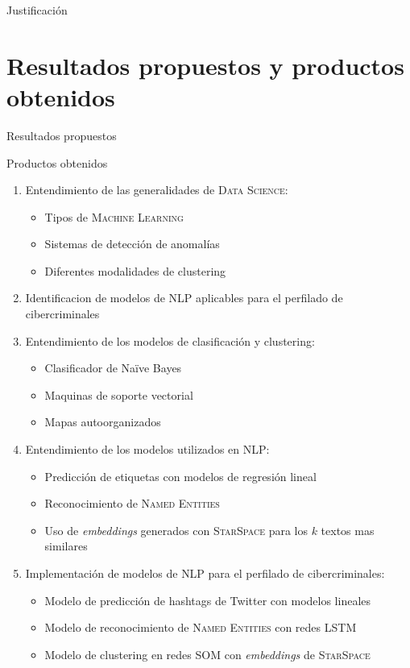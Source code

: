 \documentclass[10pt]{beamer}
\begin{document}
\begin{frame}{Justificación}
\end{frame}

\section{Resultados propuestos y productos obtenidos}

\begin{frame}{Resultados propuestos}
\end{frame}

\begin{frame}[allowframebreaks]{Productos obtenidos}
  \begin{enumerate}
  \item Entendimiento de las generalidades de \textsc{Data Science}:
    \begin{itemize}
    \item Tipos de \textsc{Machine Learning}
    \item Sistemas de detección de anomalías
    \item Diferentes modalidades de clustering
    \end{itemize}
  \item Identificacion de modelos de \textsc{NLP} aplicables para el perfilado de cibercriminales
    
  \item Entendimiento de los modelos de clasificación y clustering:
    \begin{itemize}
    \item Clasificador de Na\"ive Bayes
    \item Maquinas de soporte vectorial
    \item Mapas autoorganizados
    \end{itemize}
    
  \item Entendimiento de los modelos utilizados en \textsc{NLP}:
    \begin{itemize}
    \item Predicción de etiquetas con modelos de regresión lineal
    \item Reconocimiento de \textsc{Named Entities}
    \item Uso de \emph{embeddings} generados con \textsc{StarSpace} para los $k$ textos mas similares
    \end{itemize}
    
  \item Implementación de modelos de \textsc{NLP} para el perfilado de cibercriminales:
    \begin{itemize}
    \item Modelo de predicción de hashtags de Twitter con modelos lineales
    \item Modelo de reconocimiento de \textsc{Named Entities} con redes \textsc{LSTM}
    \item Modelo de clustering en redes \textsc{SOM} con \emph{embeddings} de \textsc{StarSpace}
    \end{itemize}
    
  \end{enumerate}
\end{frame}
\end{document}
